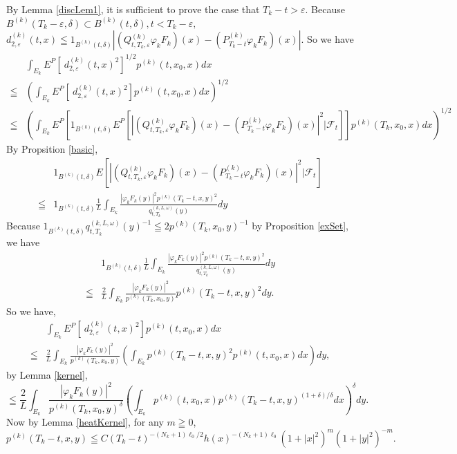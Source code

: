 \documentclass[12pt]{article}
\begin{document}
By Lemma \ref{discLem1}, it is sufficient to prove the case that
 $T_k-t > \varepsilon$. 
Because $B^{(k)}(T_k-\varepsilon, \delta) \subset B^{(k)}(t, \delta), t< T_k-\varepsilon,$
$d_{2,\varepsilon}^{(k)}(t,x) 
\leqq 1_{B^{(k)}(t, \delta)}|(Q_{t,T_k, \varepsilon}^{(k)}\varphi_kF_k)(x)
-(P_{T_k-t}^{(k)} \varphi_kF_k)(x)|.$ So we have
\begin{align}
&\int_{E_k} E^P[\ d_{2,\varepsilon}^{(k)}(t,x)^2]^{1/2} p^{(k)}(t, x_0, x)dx \nonumber\\
\leqq &\left( \int_{E_k} E^P[\ d_{2,\varepsilon}^{(k)}(t,x)^2] p^{(k)}(t, x_0, x)dx \right)^{1/2} \nonumber\\
\leqq &\left( \int_{E_k} E^P[1_{B^{(k)}(t, \delta)}E^P[ |(Q_{t,T_k, \varepsilon}^{(k)}\varphi_kF_k)(x)
-(P_{T_k-t}^{(k)} \varphi_kF_k)(x) |^2| \mathcal{F}_t] ]p^{(k)}(T_k, x_0, x)dx \right)^{1/2} \label{d2_1}
\end{align}
By Propsition \ref{basic},
\begin{align*}
&1_{B^{(k)}(t, \delta)}E[ |(Q_{t,T_k, \varepsilon}^{(k)}\varphi_kF_k)(x)
-(P_{T_k-t}^{(k)} \varphi_kF_k)(x) |^2| \mathcal{F}_t]\\
\leqq &1_{B^{(k)}(t, \delta)} \frac{1}{L} \int_{E_k} \frac{|\varphi_kF_k(y)|^2p^{(k)}(T_k-t, x,y)^2}{q_{t,T_k}^{(k,L,\omega)}(y)}dy
\end{align*}
Because 
$ 1_{B^{(k)}(t, \delta)} q_{t,T_k}^{(k,L,\omega)}(y)^{-1} \leqq 2 p^{(k)}(T_k, x_0,y)^{-1}$
by Proposition \ref{exSet}, 
we have
\begin{align*}
&1_{B^{(k)}(t, \delta)} \frac{1}{L} \int_{E_k} \frac{|\varphi_kF_k(y)|^2p^{(k)}(T_k-t, x,y)^2}{q_{t,T_k}^{(k,L,\omega)}(y)}dy\\
\leqq &\frac{2}{L} \int_{E_k} \frac{|\varphi_kF_k(y)|^2}{p^{(k)}(T_k, x_0,y)} p^{(k)}(T_k-t, x,y)^2 dy.
\end{align*}
So we have,
\begin{align*}
&\int_{E_k} E^P[\ d_{2,\varepsilon}^{(k)}(t,x)^2] p^{(k)}(t, x_0, x)dx\\
\leqq &\frac{2}{L} \int_{E_k} \frac{|\varphi_kF_k(y)|^2}{p^{(k)}(T_k, x_0,y)} 
(\int_{E_k} p^{(k)}(T_k-t, x,y)^2 p^{(k)}(t, x_0,x)dx)dy,
\end{align*}
by Lemma \ref{kernel},
$$
\leqq \frac{2}{L} \int_{E_k} \frac{|\varphi_kF_k(y)|^2}{p^{(k)}(T_k, x_0,y)^{\delta}} 
(\int_{E_k} p^{(k)}(t, x_0, x) p^{(k)}(T_k-t, x,y)^{(1+\delta)/\delta}dx)^{\delta}dy.
$$
Now by Lemma \ref{heatKernel}, for any $m \geqq 0$,
$$p^{(k)}(T_k-t, x,y) \leqq C(T_k-t)^{-(N_k+1)\ell_0/2}h(x)^{-(N_k+1)\ell_0}(1+|x|^2)^m(1+|y|^2)^{-m}.$$
\end{document}
